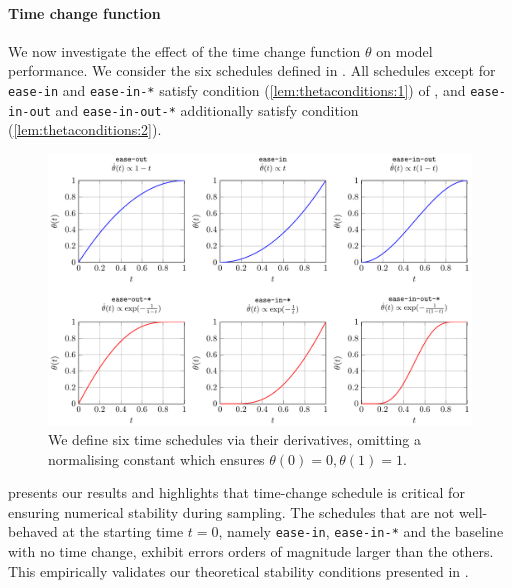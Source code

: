 \paragraph{Time change function}

We now investigate the effect of the time change function \(\theta\) on model performance. We consider the six schedules defined in . All schedules except for \texttt{ease-in} and \texttt{ease-in-*} satisfy condition (\ref{lem:thetaconditions:1}) of , and \texttt{ease-in-out} and \texttt{ease-in-out-*} additionally satisfy condition (\ref{lem:thetaconditions:2}).

\begin{figure}[tbhp]
\centering
\includegraphics[width=\linewidth]{schedules.pdf}
\caption{We define six time schedules via their derivatives, omitting a normalising constant which ensures \(\theta(0) = 0, \theta(1)=1\). }\label{fig:schedules}
\end{figure}

 presents our results and highlights that  time-change schedule is critical for ensuring numerical stability during sampling. The schedules that are not well-behaved at the starting time \(t=0\), namely \texttt{ease-in}, \texttt{ease-in-*} and the baseline with no time change, exhibit errors orders of magnitude larger than the others. This empirically validates our theoretical stability conditions presented in .

